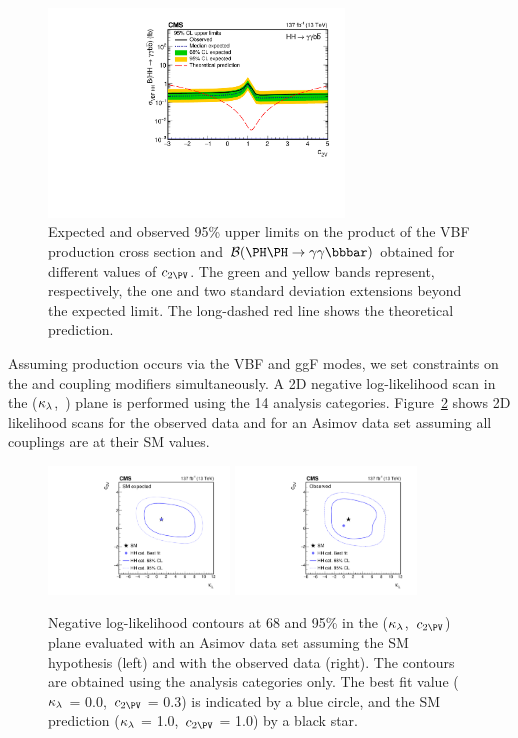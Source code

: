 \documentclass[11pt,twoside,a4paper,cmspaper,final,collab]{cms-tdr}
\begin{document}
\begin{figure}[!ht]
  \centering
\includegraphics[width=0.7\textwidth]{Figure_014.pdf}\hfil 

  \caption{Expected and observed 95\% \CL upper limits on the product of the VBF \HH production cross section and $\mathcal{B}(\HH\to\bbgg)$ obtained for different values of $\ctwov$. The green and yellow bands represent, respectively, the one and two standard deviation extensions beyond the expected limit.
The long-dashed red line shows the theoretical prediction.
}
\label{fig:ctwovscan}
\end{figure}

Assuming \HH production occurs via the VBF and ggF modes, we set constraints on the \kapl and \ctwov coupling modifiers simultaneously. A 2D negative log-likelihood scan in the ($\kappa_{\lambda}$,~\ctwov) plane is performed using the 14 \HH analysis categories. 
Figure~\ref{fig:klctwovlikelihood} shows 2D likelihood scans for the observed data and for an Asimov data set assuming all couplings are at their SM values.

\begin{figure}[!htb]
  \centering
\includegraphics[width=0.43\textwidth]{Figure_015-a.pdf}
\includegraphics[width=0.43\textwidth]{Figure_015-b.pdf}
  \caption{Negative log-likelihood contours at 68 and 95\% \CL in the ($\kappa_{\lambda}$,~$\ctwov$) plane evaluated with an Asimov data set assuming the SM hypothesis (left) and with the observed data (right). The contours are obtained using the \HH analysis categories only. The best fit value ($\kappa_{\lambda}$ = 0.0,~$\ctwov$ = 0.3) is indicated by a blue circle, and the SM prediction ($\kappa_{\lambda}$ = 1.0,~$\ctwov$ = 1.0) by a black star.}
  \label{fig:klctwovlikelihood}
\end{figure}
\end{document}
